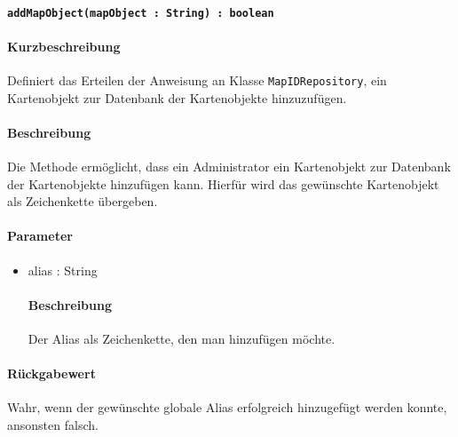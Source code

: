 \paragraph{\texttt{addMapObject(mapObject : String) : boolean}}%
\paragraph*{Kurzbeschreibung}
Definiert das Erteilen der Anweisung an Klasse \texttt{MapIDRepository}, ein Kartenobjekt zur Datenbank der Kartenobjekte hinzuzufügen.
\paragraph*{Beschreibung}
Die Methode ermöglicht, dass ein Administrator ein Kartenobjekt zur Datenbank der Kartenobjekte hinzufügen kann.
Hierfür wird das gewünschte Kartenobjekt als Zeichenkette übergeben.
\paragraph*{Parameter}
\begin{itemize}
    \item alias : String
    		\paragraph*{Beschreibung}
    		Der Alias als Zeichenkette, den man hinzufügen möchte.
\end{itemize}
\paragraph*{Rückgabewert}
Wahr, wenn der gewünschte globale Alias erfolgreich hinzugefügt werden konnte, ansonsten falsch.

